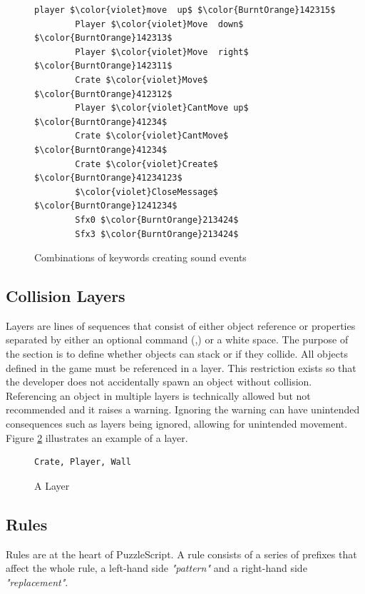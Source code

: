 \begin{figure}
    \centering
    \begin{lstlisting}[language=PuzzleScript]
        player $\color{violet}move  up$ $\color{BurntOrange}142315$
        Player $\color{violet}Move  down$ $\color{BurntOrange}142313$
        Player $\color{violet}Move  right$ $\color{BurntOrange}142311$
        Crate $\color{violet}Move$ $\color{BurntOrange}412312$
        Player $\color{violet}CantMove up$ $\color{BurntOrange}41234$
        Crate $\color{violet}CantMove$ $\color{BurntOrange}41234$
        Crate $\color{violet}Create$ $\color{BurntOrange}41234123$
        $\color{violet}CloseMessage$ $\color{BurntOrange}1241234$
        Sfx0 $\color{BurntOrange}213424$
        Sfx3 $\color{BurntOrange}213424$
    \end{lstlisting}
    \caption{Combinations of keywords creating sound events}
    \label{fig:sound_code}
\end{figure}

\subsection{Collision Layers}
Layers are lines of sequences that consist of either object reference or properties separated by either an optional command (,) or a white space. The purpose of the section is to define whether objects can stack or if they collide. All objects defined in the game must be referenced in a layer. This restriction exists so that the developer does not accidentally spawn an object without collision. Referencing an object in multiple layers is technically allowed but not recommended and it raises a warning. Ignoring the warning can have unintended consequences such as layers being ignored, allowing for unintended movement. Figure \ref{fig:layer_code} illustrates an example of a layer.


\begin{figure}
    \centering
    \begin{lstlisting}[language=PuzzleScript]
        Crate, Player, Wall
    \end{lstlisting}
    \caption{A Layer}
    \label{fig:layer_code}
\end{figure}

\subsection{Rules}
Rules are at the heart of PuzzleScript. A rule consists of a series of prefixes that affect the whole rule, a left-hand side \emph{"pattern"} and a right-hand side \emph{"replacement"}. 

